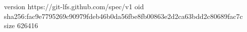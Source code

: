 version https://git-lfs.github.com/spec/v1
oid sha256:fac9e7795269c90979fdeb46b0da56fbe8fb00863e2d2ca63bdd2c80689fac7c
size 626416
